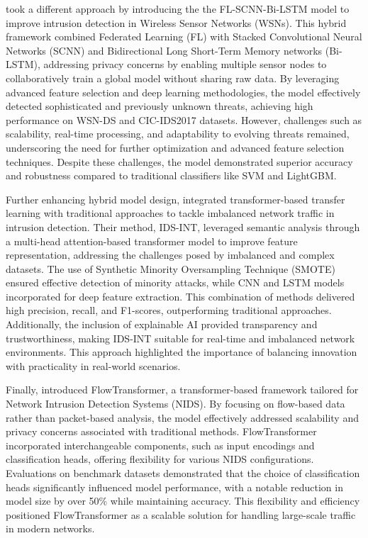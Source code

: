 \citet{bukhari2024secure} took a different approach by introducing the the FL-SCNN-Bi-LSTM model to improve intrusion detection in Wireless Sensor Networks (WSNs). This hybrid framework combined Federated Learning (FL) with Stacked Convolutional Neural Networks (SCNN) and Bidirectional Long Short-Term Memory networks (Bi-LSTM), addressing privacy concerns by enabling multiple sensor nodes to collaboratively train a global model without sharing raw data. By leveraging advanced feature selection and deep learning methodologies, the model effectively detected sophisticated and previously unknown threats, achieving high performance on WSN-DS and CIC-IDS2017 datasets. However, challenges such as scalability, real-time processing, and adaptability to evolving threats remained, underscoring the need for further optimization and advanced feature selection techniques. Despite these challenges, the model demonstrated superior accuracy and robustness compared to traditional classifiers like SVM and LightGBM.

Further enhancing hybrid model design, \citet{ullah2024ids} integrated transformer-based transfer learning with traditional approaches to tackle imbalanced network traffic in intrusion detection. Their method, IDS-INT, leveraged semantic analysis through a multi-head attention-based transformer model to improve feature representation, addressing the challenges posed by imbalanced and complex datasets. The use of Synthetic Minority Oversampling Technique (SMOTE) ensured effective detection of minority attacks, while CNN and LSTM models incorporated for deep feature extraction. This combination of methods delivered high precision, recall, and F1-scores, outperforming traditional approaches. Additionally, the inclusion of explainable AI provided transparency and trustworthiness, making IDS-INT suitable for real-time and imbalanced network environments. This approach highlighted the importance of balancing innovation with practicality in real-world scenarios.

Finally, \citet{manocchio2024flowtransformer} introduced FlowTransformer, a transformer-based framework tailored for Network Intrusion Detection Systems (NIDS). By focusing on flow-based data rather than packet-based analysis, the model effectively addressed scalability and privacy concerns associated with traditional methods. FlowTransformer incorporated interchangeable components, such as input encodings and classification heads, offering flexibility for various NIDS configurations. Evaluations on benchmark datasets demonstrated that the choice of classification heads significantly influenced model performance, with a notable reduction in model size by over 50\% while maintaining accuracy. This flexibility and efficiency positioned FlowTransformer as a scalable solution for handling large-scale traffic in modern networks.

